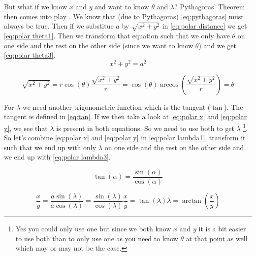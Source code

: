 But what if we know $x$ and $y$ and want to know $\theta$ and $\lambda$? Pythagoras' Theorem then comes into play \cite{pythagoras}. We know that (due to Pythagoras) \autoref{eq:pythagoras} must 
always be true. Then if we substitue $a$ by $\sqrt{x^2 + y^2}$ in \autoref{eq:polar distance} we get \autoref{eq:polar theta1}. Then we transform that equation such that we only have $\theta$ on 
one side and the rest on the other side (since we want to know $\theta$) and we get \autoref{eq:polar theta3}.
\begin{equation}
    \label{eq:pythagoras}
    x^2 + y^2 = a^2
\end{equation}

\begin{subequations}
    \begin{equation}
        \label{eq:polar theta1}
        \sqrt{x^2 + y^2} = r\cos(\theta)
    \end{equation}
    \begin{equation}
        \label{eq:polar theta2}
        \frac{\sqrt{x^2 + y^2}}{r} = \cos(\theta)
    \end{equation}
    \begin{equation}
        \label{eq:polar theta3}
        \arccos(\frac{\sqrt{x^2 + y^2}}{r}) = \theta
    \end{equation}
\end{subequations}

For $\lambda$ we need another trigonometric function which is the tangent ($\tan$). The tangent is defined in \autoref{eq:tan}. If we then take a look at \autoref{eq:polar x} and 
\autoref{eq:polar y}, we see that $\lambda$ is present in both equations. So we need to use both to get $\lambda$ \footnote{Yes you could only use one but since we both know $x$ and $y$ it is a
bit easier to use both than to only use one as you need to know $\theta$ at that point as well which may or may not be the case.}. So let's combine \autoref{eq:polar x} and \autoref{eq:polar y}
in \autoref{eq:polar lambda1}, transform it such that we end up with only $\lambda$ on one side and the rest on the other side and we end up with \autoref{eq:polar lambda3}.

\begin{equation}
    \label{eq:tan}
    \tan(\alpha) = \frac{\sin(\alpha)}{\cos(\alpha)}
\end{equation}

\begin{subequations}
    \begin{equation}
        \label{eq:polar lambda1}
        \frac{x}{y} = \frac{a\sin(\lambda)}{a\cos(\lambda)} = \frac{\sin(\lambda)}{\cos(\lambda)}
    \end{equation}
    \begin{equation}
        \label{eq:polar lambda2}
        \frac{x}{y} = \tan(\lambda)
    \end{equation}
    \begin{equation}
        \label{eq:polar lambda3}
        \lambda = \arctan(\frac{x}{y})
    \end{equation}
\end{subequations}

